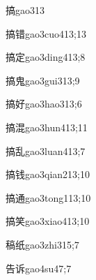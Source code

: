 \begin{verbete}{搞}{gao3}{13}
\end{verbete}

\begin{verbete}{搞错}{gao3cuo4}{13;13}
\end{verbete}

\begin{verbete}{搞定}{gao3ding4}{13;8}
\end{verbete}

\begin{verbete}{搞鬼}{gao3gui3}{13;9}
\end{verbete}

\begin{verbete}{搞好}{gao3hao3}{13;6}
\end{verbete}

\begin{verbete}{搞混}{gao3hun4}{13;11}
\end{verbete}

\begin{verbete}{搞乱}{gao3luan4}{13;7}
\end{verbete}

\begin{verbete}{搞钱}{gao3qian2}{13;10}
\end{verbete}

\begin{verbete}{搞通}{gao3tong1}{13;10}
\end{verbete}

\begin{verbete}{搞笑}{gao3xiao4}{13;10}
\end{verbete}

\begin{verbete}{稿纸}{gao3zhi3}{15;7}
\end{verbete}

\begin{verbete}{告诉}{gao4su4}{7;7}
\end{verbete}

